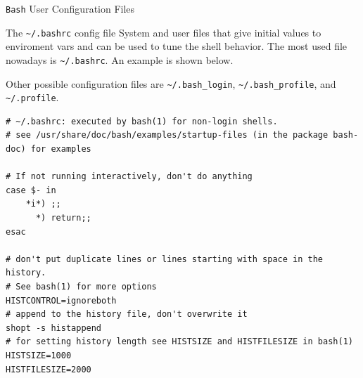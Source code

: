 \begin{frame}[t,fragile]{\texttt{Bash} User Configuration Files}

  \vspace{-0.3cm}
  \begin{block}{The \alert{\texttt{\textasciitilde/.bashrc}} config file}
    {\footnotesize
System and user files that give initial values to enviroment vars and can be used to tune
  the shell behavior. The most used file nowadays is \alert{\texttt{\textasciitilde/.bashrc}}. An
  example is shown below.
}

{\scriptsize Other possible configuration files are
  \alert{\texttt{\textasciitilde/.bash\_login}},
  \alert{\texttt{\textasciitilde/.bash\_profile}}, and  \alert{\texttt{\textasciitilde/.profile}}.
}


\vspace{-0.1cm}
{\tiny
        \begin{lstlisting}
# ~/.bashrc: executed by bash(1) for non-login shells.
# see /usr/share/doc/bash/examples/startup-files (in the package bash-doc) for examples

# If not running interactively, don't do anything
case $- in
    *i*) ;;
      *) return;;
esac

# don't put duplicate lines or lines starting with space in the history.
# See bash(1) for more options
HISTCONTROL=ignoreboth
# append to the history file, don't overwrite it
shopt -s histappend
# for setting history length see HISTSIZE and HISTFILESIZE in bash(1)
HISTSIZE=1000
HISTFILESIZE=2000
        \end{lstlisting}%
}
  \end{block}
  
\end{frame}
